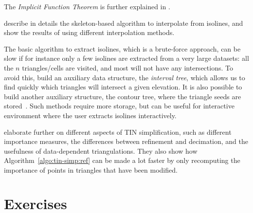 The \emph{Implicit Function Theorem} is further explained in \citet{Sibson97}.

\citet{Dakowicz03} describe in details the skeleton-based algorithm to interpolate from isolines, and show the results of using different interpolation methods.

The basic algorithm to extract isolines, which is a brute-force approach, can be slow if for instance only a few isolines are extracted from a very large datasets: all the $n$ triangles/cells are visited, and most will not have any intersections.
To avoid this, \citet{vanKreveld96} build an auxiliary data structure, the \emph{interval tree}, which allows us to find quickly which triangles will intersect a given elevation.
It is also possible to build another auxiliary structure, the contour tree, where the triangle seeds are stored~\citep{vanKreveld97-1}.
Such methods require more storage, but can be useful for interactive environment where the user extracts isolines interactively.

\citet{Garland95} elaborate further on different aspects of TIN simplification, such as different importance measures, the differences between refinement and decimation, and the usefulness of data-dependent triangulations. 
They also show how Algorithm~\ref{algo:tin-simp:ref} can be made a lot faster by only recomputing the importance of points in triangles that have been modified. 


%
\section{Exercises}

